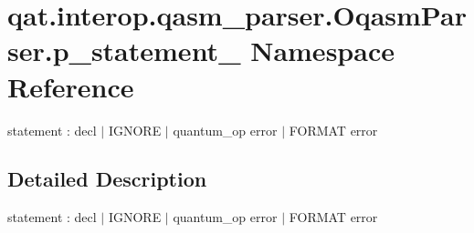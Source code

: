 \hypertarget{namespaceqat_1_1interop_1_1qasm__parser_1_1OqasmParser_1_1p__statement__1}{\section{qat.\-interop.\-qasm\-\_\-parser.\-Oqasm\-Parser.\-p\-\_\-statement\-\_ Namespace Reference}
\label{namespaceqat_1_1interop_1_1qasm__parser_1_1OqasmParser_1_1p__statement__1}
}


statement \-: decl $|$ I\-G\-N\-O\-R\-E $|$ quantum\-\_\-op error $|$ F\-O\-R\-M\-A\-T error  




\subsection{Detailed Description}
statement \-: decl $|$ I\-G\-N\-O\-R\-E $|$ quantum\-\_\-op error $|$ F\-O\-R\-M\-A\-T error 